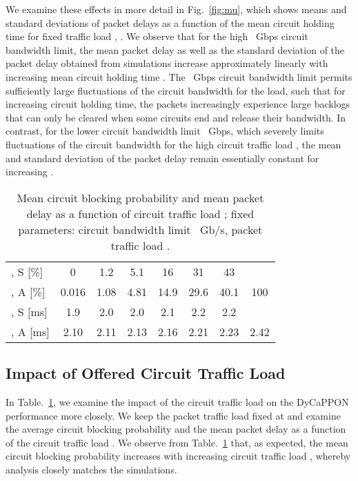 \documentclass[article]{IEEEtran}
\begin{document}
We examine these effects in more detail in
Fig.~\ref{fig:mu}, which shows means and standard deviations of
packet delays as a function of the mean circuit holding time 
for fixed traffic load , . We observe that
for the high ~Gbps circuit bandwidth limit, the mean packet
delay as well as the standard deviation of the packet delay obtained
from simulations increase approximately linearly with increasing
mean circuit holding time . The ~Gbps circuit
bandwidth limit permits sufficiently large fluctuations of the
circuit bandwidth  for the  load, such that for
increasing circuit holding time, the packets increasingly experience
large backlogs that can only be cleared when some circuits end and
release their bandwidth. In contrast,
for the lower circuit bandwidth limit ~Gbps, which severely
limits fluctuations of the circuit bandwidth  for the high
circuit traffic load , the mean and standard deviation
of the packet delay remain essentially constant for increasing
.


\begin{table}[t]
\caption{Mean circuit blocking probability 
and mean packet delay 
as a function of circuit traffic load ;
fixed parameters: circuit bandwidth limit ~Gb/s,
packet traffic load .}
\label{fig:chi}
\vspace{-0.75cm}
\begin{center}
\begin{tabular}{|l|ccccccc|} \hline
 &   &    &      &  
        &  &  &   \\ \hline
, S [\%] & 0 & 1.2  &  5.1  &  16 & 31 & 43  & \\
, A [\%] & 0.016 & 1.08  &  4.81 &  14.9 & 29.6  & 40.1 &100\\ \hline
, S [ms] & 1.9 &  2.0  & 2.0  &  2.1 & 2.2 &  2.2&  \\
, A [ms] & 2.10&  2.11 & 2.13 & 2.16 & 2.21& 2.23& 2.42  \\   \hline
\end{tabular}
\end{center}
\end{table}
\subsection{Impact of Offered Circuit Traffic Load }
\label{chi_impact:sec}
In Table.~\ref{fig:chi}, we examine the impact of the
circuit traffic load  on the DyCaPPON performance
more closely.
We keep the packet traffic load fixed at 
and examine the average circuit blocking probability 
and the mean packet delay  as a function of the circuit traffic load .
We observe from Table.~\ref{fig:chi} that, as expected, the
mean circuit blocking probability  increases with increasing
circuit traffic load , whereby analysis closely matches the simulations.
\end{document}
